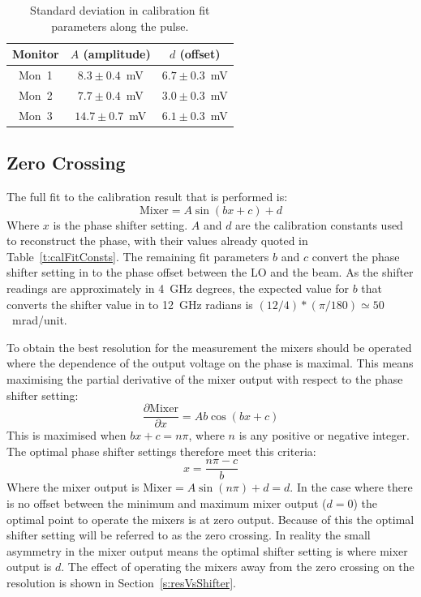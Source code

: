 \begin{table}
  \begin{center}
    \begin{tabular}{|c c c|}
	   \hline
       Monitor & \(A\) (amplitude) & \(d\) (offset) \\ \hline
       Mon~1 & \(8.3\pm0.4\)~mV & \(6.7\pm0.3\)~mV \\ 
       Mon~2 & \(7.7\pm0.4\)~mV & \(3.0\pm0.3\)~mV\\
       Mon~3 & \(14.7\pm0.7\)~mV & \(6.1\pm0.3\)~mV\\ \hline
    \end{tabular}
    \caption{Standard deviation in calibration fit parameters along the pulse.}
  	\label{t:calConstsStdAlong}
  \end{center}
\end{table}

\subsection{Zero Crossing}
\label{ss:calZeroCross}

The full fit to the calibration result that is performed is:
\begin{equation}
\mathrm{Mixer} = A\sin(bx + c) + d
\end{equation}
Where \(x\) is the phase shifter setting. \(A\) and \(d\) are the calibration constants used to reconstruct the phase, with their values already quoted in Table~\ref{t:calFitConsts}. The remaining fit parameters \(b\) and \(c\) convert the phase shifter setting in to the phase offset between the LO and the beam. As the shifter readings are approximately in 4~GHz degrees, the expected value for \(b\) that converts the shifter value in to 12~GHz radians is \((12/4)*(\pi/180) \simeq 50\)~mrad/unit.

To obtain the best resolution for the measurement the mixers should be operated where the dependence of the output voltage on the phase is maximal. This means maximising the partial derivative of the mixer output with respect to the phase shifter setting:
\begin{equation}
\frac{\partial \mathrm{Mixer}}{\partial x} = Ab\cos(bx+c)
\end{equation}
This is maximised when \(bx + c = n\pi\), where \(n\) is any positive or negative integer. The optimal phase shifter settings therefore meet this criteria:
\begin{equation}
x = \frac{n\pi-c}{b}
\end{equation}
Where the mixer output is \(\mathrm{Mixer} = A\sin(n\pi)+d = d\). In the case where there is no offset between the minimum and maximum mixer output (\(d=0\)) the optimal point to operate the mixers is at zero output. Because of this the optimal shifter setting will be referred to as the zero crossing. In reality the small asymmetry in the mixer output means the optimal shifter setting is where mixer output is \(d\). The effect of operating the mixers away from the zero crossing on the resolution is shown in Section~\ref{s:resVsShifter}.

